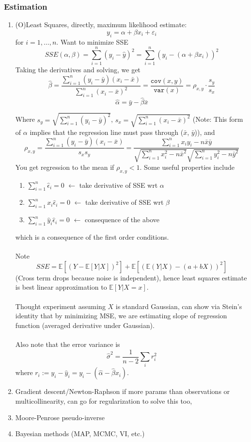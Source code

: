 \documentclass{article}
\begin{document}
\subsubsection{Estimation}
\begin{enumerate}
  \item (O)Least Squares, directly, maximum likelihood estimate:
    $$ y_i = \alpha + \beta x_i + \varepsilon_i $$ for $i=1,\ldots, n$.
    Want to minimize SSE
    $$ SSE(\alpha, \beta) = \sum_{i=1}^{n} (y_i - \hat{y})^2 = \sum_{i=1}^{n} (y_i - (\alpha + \beta x_i))^2$$
    Taking the derivatives and solving, we get
    $$ \hat{\beta} = \frac{\sum_{i=1}^{n}(y_i - \bar{y})(x_i - \bar{x})}{\sum_{i=1}^{n}(x_i - \bar{x})^2} = \frac{\mathtt{cov}(x, y)}{\mathtt{var}(x)} = \rho_{x, y} \cdot \frac{s_y}{s_x}$$
    $$ \hat{\alpha} = \bar{y} - \hat{\beta} \bar{x}$$

    Where $s_y = \sqrt{\sum_{i=1}^{n}(y_i - \bar{y})^2}$,  $s_x = \sqrt{\sum_{i=1}^{n}(x_i - \bar{x})^2}$ (Note: This form of $\alpha$ implies that the regression line must pass through ($\bar{x}$, $\bar{y}$)), and
    $$\rho_{x, y} = \frac{\sum_{i=1}^{n}(y_i - \bar{y})(x_i - \bar{x})}{s_x s_y} = \frac{\sum_{i=1}^{n}x_iy_i - n\bar{x}\bar{y}}{\sqrt{\sum_{i=1}^{n}x_i^2 - n \bar{x}^2}\sqrt{\sum_{i=1}^{n}y_i^2 - n \bar{y}^2}}$$
    You get regression to the mean if $\rho_{x, y} < 1$. Some useful properties include
    \begin{enumerate}
      \item $\sum_{i=1}^{n} \hat{\epsilon}_i= 0$ $\leftarrow$ take derivative of SSE wrt $\alpha$
      \item $\sum_{i=1}^{n} x_i\hat{\epsilon}_i= 0$ $\leftarrow$ take derivative of SSE wrt $\beta$
      \item $\sum_{i=1}^{n} \hat{y}_i\hat{\epsilon}_i= 0$ $\leftarrow$ consequence of the above
    \end{enumerate}
    which is a consequence of the first order conditions.
    \\ \\
    Note $$ SSE = \mathbb{E}[(Y - \mathbb{E}[Y|X])^2] + \mathbb{E}[(\mathbb{E}(Y|X) - (a + bX))^2] $$
    (Cross term drops because noise is independent), hence least squares estimate is best linear approximation to $\mathbb{E}[Y|X = x]$.
    \\ \\
    Thought experiment assuming $X$ is standard Gaussian, can show via Stein's identity that by minimizing MSE, we are estimating slope of regression function (averaged derivative under Gaussian).
    \\ \\
    Also note that the error variance is $$ \hat{\sigma}^2 = \frac{1}{n-2} \sum_{i}r_i^2 $$
    where $r_i := y_i - \hat{y}_i = y_i - (\hat{\alpha} - \hat{\beta}x_i)$.
  \item Gradient descent/Newton-Raphson if more params than observations or multicollinearity, can go for regularization to solve this too,
  \item Moore-Penrose pseudo-inverse
  \item Bayesian methods (MAP, MCMC, VI, etc.)
\end{enumerate}
\end{document}
